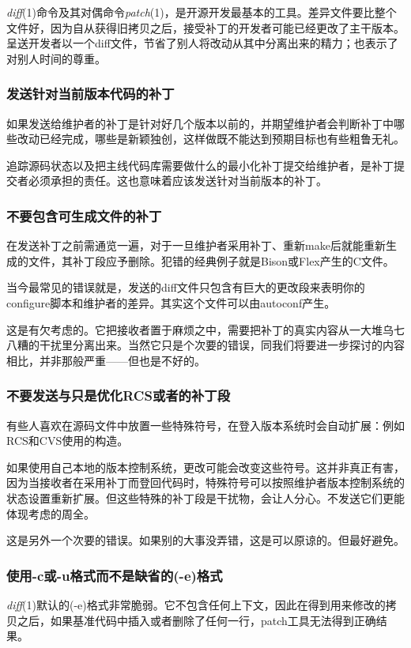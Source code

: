 \documentclass[12pt,oneside]{book}
\begin{document}
\textit{diff}(1)命令及其对偶命令\textit{patch}(1)，是开源开发最基本的工具。差异文件要比整个文件好，因为自从获得旧拷贝之后，接受补丁的开发者可能已经更改了主干版本。呈送开发者以一个diff文件，节省了别人将改动从其中分离出来的精力；也表示了对别人时间的尊重。

\subsubsection{发送针对当前版本代码的补丁}
如果发送给维护者的补丁是针对好几个版本以前的，并期望维护者会判断补丁中哪些改动已经完成，哪些是新颖独创，这样做既不能达到预期目标也有些粗鲁无礼。

追踪源码状态以及把主线代码库需要做什么的最小化补丁提交给维护者，是补丁提交者必须承担的责任。这也意味着应该发送针对当前版本的补丁。

\subsubsection{不要包含可生成文件的补丁}
在发送补丁之前需通览一遍，对于一旦维护者采用补丁、重新make后就能重新生成的文件，其补丁段应予删除。犯错的经典例子就是Bison或Flex产生的C文件。

当今最常见的错误就是，发送的diff文件只包含有巨大的更改段来表明你的configure脚本和维护者的差异。其实这个文件可以由autoconf产生。

这是有欠考虑的。它把接收者置于麻烦之中，需要把补丁的真实内容从一大堆乌七八糟的干扰里分离出来。当然它只是个次要的错误，同我们将要进一步探讨的内容相比，并非那般严重——但也是不好的。

\subsubsection{不要发送与只是优化RCS或者的补丁段}
有些人喜欢在源码文件中放置一些特殊符号，在登入版本系统时会自动扩展：例如RCS和CVS使用的构造。

如果使用自己本地的版本控制系统，更改可能会改变这些符号。这并非真正有害，因为当接收者在采用补丁而登回代码时，特殊符号可以按照维护者版本控制系统的状态设置重新扩展。但这些特殊的补丁段是干扰物，会让人分心。不发送它们更能体现考虑的周全。

这是另外一个次要的错误。如果别的大事没弄错，这是可以原谅的。但最好避免。

\subsubsection{使用-c或-u格式而不是缺省的(-e)格式}
\textit{diff}(1)默认的(-e)格式非常脆弱。它不包含任何上下文，因此在得到用来修改的拷贝之后，如果基准代码中插入或者删除了任何一行，patch工具无法得到正确结果。
\end{document}
